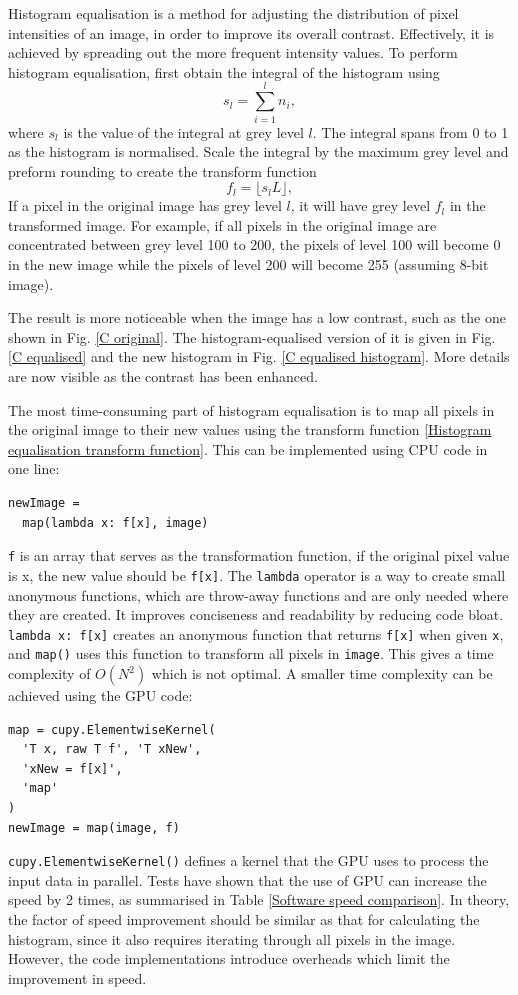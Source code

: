 \documentclass[12pt, conference]{IEEEtran}
\begin{document}
Histogram equalisation is a method for adjusting the distribution of pixel intensities of an image, in order to improve its overall contrast. Effectively, it is achieved by spreading out the more frequent intensity values. To perform histogram equalisation, first obtain the integral of the histogram using
\[s_l = \sum_{i=1}^{l} n_i,\]
where $s_l$ is the value of the integral at grey level $l$. The integral spans from 0 to 1 as the histogram is normalised. Scale the integral by the maximum grey level and preform rounding to create the transform function
\begin{equation}
    f_l = \lfloor s_lL \rfloor,
    \label{Histogram equalisation transform function}
\end{equation}
If a pixel in the original image has grey level $l$, it will have grey level $f_l$ in the transformed image. For example, if all pixels in the original image are concentrated between grey level 100 to 200, the pixels of level 100 will become 0 in the new image while the pixels of level 200 will become 255 (assuming 8-bit image).

The result is more noticeable when the image has a low contrast, such as the one shown in Fig. \ref{C original}. The histogram-equalised version of it is given in Fig. \ref{C equalised} and the new histogram in Fig. \ref{C equalised histogram}. More details are now visible as the contrast has been enhanced.

The most time-consuming part of histogram equalisation is to map all pixels in the original image to their new values using the transform function \eqref{Histogram equalisation transform function}. This can be implemented using CPU code in one line:
\begin{lstlisting}
newImage = 
  map(lambda x: f[x], image)
\end{lstlisting}
\lstinline{f} is an array that serves as the transformation function, if the original pixel value is x, the new value should be \lstinline{f[x]}. The \lstinline{lambda} operator is a way to create small anonymous functions, which are throw-away functions and are only needed where they are created. It improves conciseness and readability by reducing code bloat. \lstinline{lambda x: f[x]} creates an anonymous function that returns \lstinline{f[x]} when given \lstinline{x}, and \lstinline{map()} uses this function to transform all pixels in \lstinline{image}. This gives a time complexity of $O(N^2)$ which is not optimal. A smaller time complexity can be achieved using the GPU code:
\begin{lstlisting}
map = cupy.ElementwiseKernel(
  'T x, raw T f', 'T xNew',
  'xNew = f[x]',
  'map'
)
newImage = map(image, f)
\end{lstlisting}
\lstinline{cupy.ElementwiseKernel()} defines a kernel that the GPU uses to process the input data in parallel. Tests have shown that the use of GPU can increase the speed by 2 times, as summarised in Table \ref{Software speed comparison}. In theory, the factor of speed improvement should be similar as that for calculating the histogram, since it also requires iterating through all pixels in the image. However, the code implementations introduce overheads which limit the improvement in speed.
\end{document}
